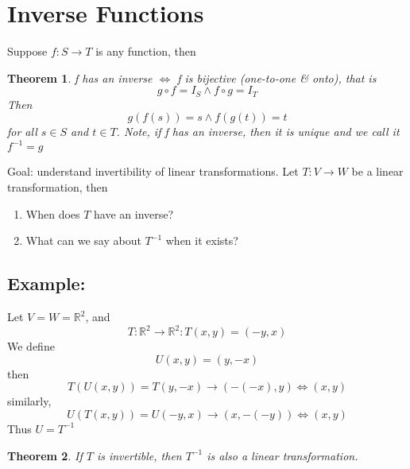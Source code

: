 \documentclass{article}
\newtheorem{theorem}{Theorem}[section]
\newtheorem{one minute paper}[theorem]{One Minute Paper}
\begin{document}
\section*{Inverse Functions}

Suppose $f: S \rightarrow T$ is any function, then 
\begin{theorem}
    f has an inverse $\iff$ f is bijective (one-to-one \& onto), that is 
    \begin{equation}
        g \circ f = I_S \land f \circ g = I_T
    \end{equation}
    Then 
    \begin{equation}
        g(f(s)) = s \land f(g(t)) = t
    \end{equation}
    for all $s \in S$ and $t \in T$. Note, if f has an inverse, then it is unique and we call it $f^{-1} = g$
\end{theorem}

Goal: understand invertibility of linear transformations. Let $T: V \rightarrow W$ be a linear transformation, then 
\begin{enumerate}
    \item When does $T$ have an inverse?
    \item What can we say about $T^{-1}$ when it exists? 
\end{enumerate}

\subsection*{Example:}

Let $V = W = \mathbb{R}^2$, and 
\begin{equation}
    T: \mathbb{R}^2 \rightarrow \mathbb{R}^2 : T(x,y) = (-y,x)
\end{equation}
We define 
\begin{equation}
    U(x,y) = (y,-x)
\end{equation}
then 
\begin{equation}
    T(U(x,y)) = T(y,-x) \rightarrow (-(-x), y) \iff (x,y)
\end{equation}
similarly, 
\begin{equation}
    U(T(x,y)) = U(-y,x) \rightarrow (x,-(-y)) \iff (x,y)
\end{equation}
Thus $U = T^{-1}$

\begin{theorem}
    If $T$ is invertible, then $T^{-1}$ is also a linear transformation. 
\end{theorem}
\end{document}

